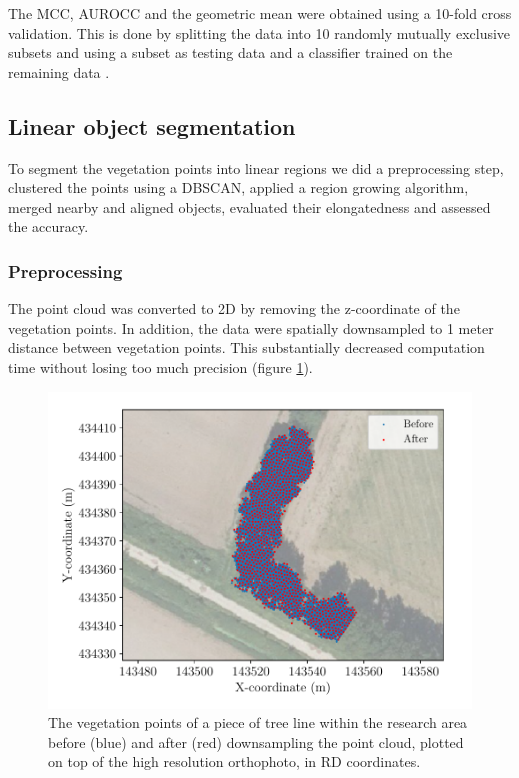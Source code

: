The MCC, AUROCC and the geometric mean were obtained using a 10-fold cross validation. This is done by splitting the data into 10 randomly mutually exclusive subsets and using a subset as testing data and a classifier trained on the remaining data \citep{kohavi1995study}.

\subsection{Linear object segmentation}
To segment the vegetation points into linear regions we did a preprocessing step, clustered the points using a DBSCAN, applied a region growing algorithm, merged nearby and aligned objects, evaluated their elongatedness and assessed the accuracy.

\subsubsection{Preprocessing}
The point cloud was converted to 2D by removing the z-coordinate of the vegetation points. In addition, the data were spatially downsampled to 1 meter distance between vegetation points. This substantially decreased computation time without losing too much precision (figure \ref{fig:downsampling}).

\begin{figure}
	\centering
	\includegraphics[scale=0.80]{./img/downsampling.pdf}
	\caption{The vegetation points of a piece of tree line within the research area before (blue) and after (red) downsampling the point cloud, plotted on top of the high resolution orthophoto, in RD coordinates.}
	\label{fig:downsampling}
\end{figure}

